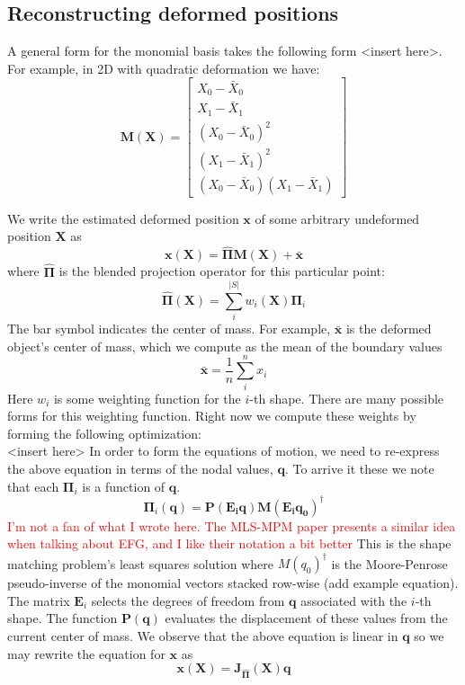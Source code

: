 \documentclass[sigconf]{acmart}
\newcommand\myworries[1]{\textcolor{red}{#1}}
\begin{document}
\subsection{Reconstructing deformed positions}
A general form for the monomial basis takes the following form <insert here>. For example, in 2D with quadratic deformation we have:
\begin{equation}
    \mathbf{M(X)} =\begin{bmatrix}
    X_0 - \bar{X}_0  \\ 
    X_1 - \bar{X}_1  \\ 
    (X_0 - \bar{X}_0)^2  \\ 
    (X_1 - \bar{X}_1)^2  \\ 
    (X_0 - \bar{X}_0)(X_1 - \bar{X}_1) 
    \end{bmatrix} 
\end{equation}

    
We write the estimated deformed position $\mathbf{x}$ of some arbitrary undeformed position $\mathbf{X}$ as
\begin{equation}
     \mathbf{x}(\mathbf{X}) = \hat{\mathbf{\Pi}}\mathbf{M}(\mathbf{X}) + \bar{\mathbf{x}} 
\end{equation}
where $\mathbf{\hat{\Pi}}$ is the blended projection operator for this particular point:
\begin{equation}
    \hat{\mathbf{\Pi}}\mathbf{(X)} = \sum_i^{|S|}w_i(\mathbf{X})\mathbf{\Pi}_i 
\end{equation}
The bar symbol indicates the center of mass. For example, $\bar{\mathbf{x}}$ is the deformed object's center of mass, which we compute as the mean of the boundary values 
\begin{equation}
    \bar{\mathbf{x}} = \frac{1}{n}\sum_i^n x_i 
\end{equation}
Here $w_i$ is some weighting function for the $i$-th shape. There are many possible forms for this weighting function. Right now we compute these weights by forming the following optimization: \\
<insert here>
In order to form the equations of motion, we need to re-express the above equation in terms of the nodal values, $\mathbf{q}$. To arrive it these we note that each $\mathbf{\Pi}_i$ is a function of $\mathbf{q}$. 
\begin{equation}
    \mathbf{\Pi}_i(\mathbf{q}) = \mathbf{P(E_i q)M(E_i q_0)^{\dagger}}
\end{equation}
\myworries{I'm not a fan of what I wrote here. The MLS-MPM paper presents a similar idea when talking about EFG, and I like their notation a bit better}
This is the shape matching problem's least squares solution where $M(q_0)^{\dagger}$ is the Moore-Penrose pseudo-inverse of the monomial vectors stacked row-wise (add example equation). The matrix $\mathbf{E}_i$ selects the degrees of freedom from $\mathbf{q}$ associated with the $i$-th shape. The function $\mathbf{P(q)}$ evaluates the displacement of these values from the current center of mass. We observe that the above equation is linear in $\mathbf{q}$ so we may rewrite the equation for $\mathbf{x}$ as 
\begin{equation}
    \mathbf{x(X)} = \mathbf{J_{\hat{\Pi}}(X)q}
\end{equation}
\end{document}
